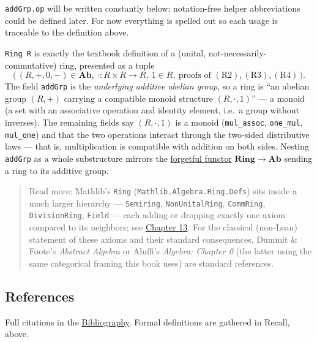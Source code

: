 \texttt{addGrp.op} will be written constantly below; notation-free helper abbreviations could be defined later. For now everything is spelled out so each usage is traceable to the definition above.

\begin{mathreading}

\texttt{Ring R} is exactly the textbook definition of a (unital, not-necessarily-commutative) ring, presented as a tuple \[
\Big(\,(R,+,0,-)\in\mathbf{Ab},\ \cdot : R\times R\to R,\ 1\in R,\
\text{proofs of }(\mathrm{R2}),(\mathrm{R3}),(\mathrm{R4})\,\Big).
\] The field \texttt{addGrp} is the \emph{underlying additive abelian group}, so a ring is ``an abelian group \((R,+)\) carrying a compatible monoid structure \((R,\cdot,1)\)'' --- a monoid (a set with an associative operation and identity element, i.e.~a group without inverses). The remaining fields say \((R,\cdot,1)\) is a monoid (\texttt{mul\_\allowbreak{}assoc}, \texttt{one\_\allowbreak{}mul}, \texttt{mul\_\allowbreak{}one}) and that the two operations interact through the two-sided distributive laws --- that is, multiplication is compatible with addition on both sides. Nesting \texttt{addGrp} as a whole substructure mirrors the \hyperref[sec:01-basics:04-terminology:1]{forgetful functor} \(\mathbf{Ring}\to\mathbf{Ab}\) sending a ring to its additive group.

\end{mathreading}

\begin{quote}
Read more: Mathlib's \texttt{Ring} (\texttt{Mathlib.Algebra.Ring.Defs}) sits inside a much larger hierarchy --- \texttt{Semiring}, \texttt{NonUnitalRing}, \texttt{CommRing}, \texttt{DivisionRing}, \texttt{Field} --- each adding or dropping exactly one axiom compared to its neighbors; see \hyperref[sec:13-next-steps:02-moving-to-mathlib:1]{Chapter 13}. For the classical (non-Lean) statement of these axioms and their standard consequences, Dummit \& Foote's \emph{Abstract Algebra} or Aluffi's \emph{Algebra: Chapter 0} (the latter using the same categorical framing this book uses) are standard references.
\end{quote}

\subsection{References}\label{sec:08-rings:03-ring:3}

Full citations in the \hyperref[sec:root:bibliography:1]{Bibliography}. Formal definitions are gathered in Recall, above.

